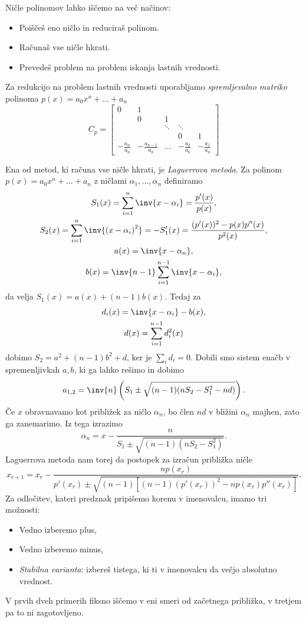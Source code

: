 Ničle polinomov lahko iščemo na več načinov:
\begin{itemize}
\item Poiščeš eno ničlo in reduciraš polinom.
\item Računaš vse ničle hkrati.
\item Prevedeš problem na problem iskanja lastnih vrednosti.
\end{itemize}
Za redukcijo na problem lastnih vrednosti uporabljamo \emph{spremljevalno
  matriko} polinoma $p(x) = a_0 x^n + \ldots + a_n$
\[
  C_p =
  \begin{bmatrix}
	0 & 1 &  & \\
	& 0 & 1 & \\
	&  & \ddots & \ddots &  \\
	& &  & 0 & 1 \\
	- \frac{a_n}{a_0} & - \frac{a_{n-1}}{a_0} & \ldots & -\frac{a_2}{a_0} & -\frac{a_1}{a_0}
  \end{bmatrix}
\]


Ena od metod, ki računa vse ničle hkrati, je \emph{Laguerrova metoda}.
Za polinom $p(x) = a_0 x^n + \ldots + a_n$ z ničlami $\alpha_1, \ldots,
\alpha_n$ definiramo
\begin{gather*}
  S_1(x) = \sum_{i=1}^n \inv{x-\alpha_i} = \frac{p'(x)}{p(x)}, \\
  S_2(x) = \sum_{i=1}^n \inv{{(x-\alpha_i)}^2} = -S_1'(x) = \frac{(p'(x))^2 -
	p(x) p''(x)}{p^2(x)}, \\
  a(x) = \inv{x - \alpha_n}, \\
  b(x) = \inv{n-1} \sum_{i=1}^{n-1} \inv{x - \alpha_i},
\end{gather*}
da velja $S_1(x) = a(x) + (n-1) b(x)$.
Tedaj za
\begin{gather*}
  d_i(x) = \inv{x-\alpha_i} - b(x), \\
  d(x) = \sum_{i=1}^{n-1} d_i^2(x)
\end{gather*}
dobimo $S_2 = a^2 + (n-1) b^2 + d$, ker je $\sum_i d_i = 0$.
Dobili smo sistem enačb v spremenljivkah $a, b$, ki ga lahko rešimo in dobimo
\[
  a_{1, 2} = \inv{n} \left( S_1 \pm \sqrt{(n-1) (n S_2 - S_1^2 - n d)} \right).
\]
Če $x$ obravnavamo kot približek za ničlo $\alpha_n$, bo člen $nd$ v bližini
$\alpha_n$ majhen, zato ga zanemarimo.
Iz tega izrazimo
\[
  \alpha_n = x - \frac{n}{S_1 \pm \sqrt{ (n-1)(n S_2 - S_1^2) }}.
\]
Laguerrova metoda nam torej da postopek za izračun približka ničle
\[
  x_{r+1} = x_r -
  \frac{n p(x_r)}{
	p'(x_r) \pm
	\sqrt{ (n-1) \left[ (n-1) (p'(x_r))^2 - n p(x_r) p''(x_r) \right] }
  }.
\]
Za odločitev, kateri predznak pripišemo korenu v imenovalcu, imamo tri možnosti:
\begin{itemize}
\item Vedno izberemo plus,
\item Vedno izberemo minus,
\item \emph{Stabilna varianta}: izbereš tistega, ki ti v imenovalcu da večjo
  absolutno vrednost.
\end{itemize}
V prvih dveh primerih fiksno iščemo v eni smeri od začetnega približka, v
tretjem pa to ni zagotovljeno.

